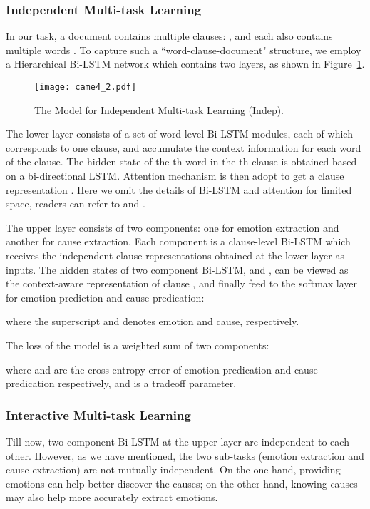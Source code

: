 \documentclass[11pt,a4paper]{article}
\begin{document}
\subsubsection{Independent Multi-task Learning}
In our task, a document contains multiple clauses: , and each  also contains multiple words . To capture such a ``word-clause-document" structure, we employ a Hierarchical Bi-LSTM network which contains two layers, as shown in Figure~\ref{FigureTwo}.

\begin{figure}
	\centering
	\texttt{[image: came4\_2.pdf]}
	\caption{The Model for Independent Multi-task Learning (Indep).}
	\label{FigureTwo}
\end{figure}

The lower layer consists of a set of word-level Bi-LSTM  modules, each of which corresponds to one clause, and accumulate the context information for each word of the clause. The hidden state of the th word in the th clause  is obtained based on a bi-directional LSTM. Attention mechanism is then adopt to get a clause representation . Here we omit the details of Bi-LSTM and attention for limited space, readers can refer to \citet{graves2013speech} and \citet{bahdanau2014neural}.

The upper layer consists of two components: one for emotion extraction and another for cause extraction. Each component is a clause-level Bi-LSTM which receives the independent clause representations  obtained at the lower layer as inputs. The hidden states of two component Bi-LSTM,   and  , can be viewed as the context-aware representation of clause , and finally feed to the softmax layer for emotion prediction and cause predication:


where the superscript  and  denotes emotion and cause, respectively.

The loss of the model is a weighted sum of two components:

where  and  are the cross-entropy error of emotion predication and cause predication respectively, and  is a tradeoff parameter.

\subsubsection{Interactive Multi-task Learning}
Till now, two component Bi-LSTM at the upper layer are independent to each other. However, as we have mentioned, the two sub-tasks (emotion extraction and cause extraction) are not mutually independent. On the one hand, providing emotions can help better discover the causes; on the other hand, knowing causes may also help more accurately extract emotions.
\end{document}

